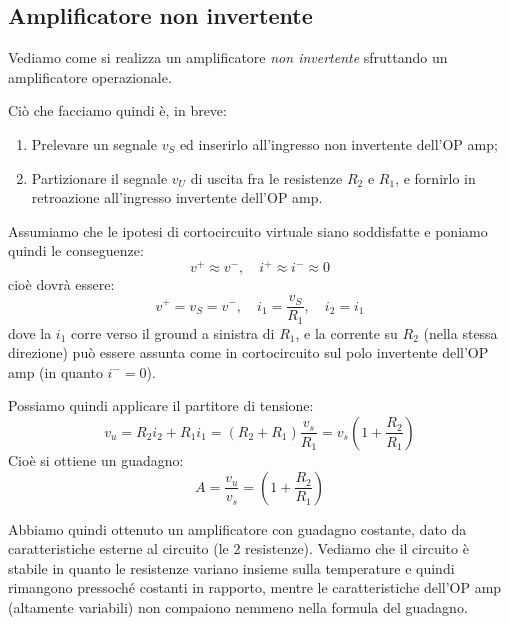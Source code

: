 \documentclass[a4paper,11pt]{article}
\begin{document}
\subsection{Amplificatore non invertente}
Vediamo come si realizza un amplificatore \textit{non invertente} sfruttando un amplificatore operazionale.

\begin{center}
\end{center}

Ciò che facciamo quindi è, in breve:
\begin{enumerate}
	\item Prelevare un segnale $v_S$ ed inserirlo all'ingresso non invertente dell'OP amp;
	\item Partizionare il segnale $v_U$ di uscita fra le resistenze $R_2$ e $R_1$, e fornirlo in retroazione all'ingresso invertente dell'OP amp.
\end{enumerate}

Assumiamo che le ipotesi di cortocircuito virtuale siano soddisfatte e poniamo quindi le conseguenze:
$$
v^+ \approx v^-, \quad i^+ \approx i^- \approx 0
$$
cioè dovrà essere:
$$
v^+ = v_S = v^-, \quad i_1 = \frac{v_S}{R_1}, \quad i_2 = i_1
$$
dove la $i_1$ corre verso il ground a sinistra di $R_1$, e la corrente su $R_2$ (nella stessa direzione) può essere assunta come in cortocircuito sul polo invertente dell'OP amp (in quanto $i^- = 0$).

Possiamo quindi applicare il partitore di tensione:
$$
v_u = R_2 i_2 + R_1 i_1 = (R_2 + R_1) \frac{v_s}{R_1} = v_s \left( 1 + \frac{R_2}{R_1} \right) 
$$
Cioè si ottiene un guadagno:
$$
A = \frac{v_u}{v_s} = \left(1 + \frac{R_2}{R_1}\right)
$$

Abbiamo quindi ottenuto un amplificatore con guadagno costante, dato da caratteristiche esterne al circuito (le 2 resistenze). Vediamo che il circuito è stabile in quanto le resistenze variano insieme sulla temperature e quindi rimangono pressoché costanti in rapporto, mentre le caratteristiche dell'OP amp (altamente variabili) non compaiono nemmeno nella formula del guadagno.
\end{document}
